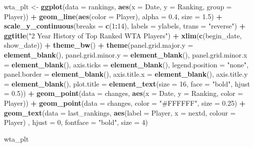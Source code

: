 \documentclass[]{book}
\newenvironment{Shaded}{\begin{snugshade}}{\end{snugshade}}
\newcommand{\DataTypeTok}[1]{\textcolor[rgb]{0.13,0.29,0.53}{#1}}
\newcommand{\DecValTok}[1]{\textcolor[rgb]{0.00,0.00,0.81}{#1}}
\newcommand{\FloatTok}[1]{\textcolor[rgb]{0.00,0.00,0.81}{#1}}
\newcommand{\KeywordTok}[1]{\textcolor[rgb]{0.13,0.29,0.53}{\textbf{#1}}}
\newcommand{\NormalTok}[1]{#1}
\newcommand{\OperatorTok}[1]{\textcolor[rgb]{0.81,0.36,0.00}{\textbf{#1}}}
\newcommand{\StringTok}[1]{\textcolor[rgb]{0.31,0.60,0.02}{#1}}
\begin{document}
\begin{Shaded}
\begin{Highlighting}[]
\NormalTok{wta_plt <-}\StringTok{ }\KeywordTok{ggplot}\NormalTok{(}\DataTypeTok{data =}\NormalTok{ rankings, }\KeywordTok{aes}\NormalTok{(}\DataTypeTok{x =}\NormalTok{ Date, }\DataTypeTok{y =}\NormalTok{ Ranking, }\DataTypeTok{group =}\NormalTok{ Player)) }\OperatorTok{+}\StringTok{ }
\StringTok{  }\KeywordTok{geom_line}\NormalTok{(}\KeywordTok{aes}\NormalTok{(}\DataTypeTok{color =}\NormalTok{ Player), }\DataTypeTok{alpha =} \FloatTok{0.4}\NormalTok{, }\DataTypeTok{size =} \FloatTok{1.5}\NormalTok{) }\OperatorTok{+}
\StringTok{  }\KeywordTok{scale_y_continuous}\NormalTok{(}\DataTypeTok{breaks =} \KeywordTok{c}\NormalTok{(}\DecValTok{1}\OperatorTok{:}\DecValTok{14}\NormalTok{), }\DataTypeTok{labels =}\NormalTok{ ylabels, }\DataTypeTok{trans =} \StringTok{"reverse"}\NormalTok{) }\OperatorTok{+}\StringTok{ }
\StringTok{  }\KeywordTok{ggtitle}\NormalTok{(}\StringTok{"2 Year History of Top Ranked WTA Players"}\NormalTok{) }\OperatorTok{+}\StringTok{ }
\StringTok{  }\KeywordTok{xlim}\NormalTok{(}\KeywordTok{c}\NormalTok{(begin_date, show_date)) }\OperatorTok{+}
\StringTok{  }\KeywordTok{theme_bw}\NormalTok{() }\OperatorTok{+}\StringTok{ }
\StringTok{  }\KeywordTok{theme}\NormalTok{(}\DataTypeTok{panel.grid.major.y =} \KeywordTok{element_blank}\NormalTok{(), }\DataTypeTok{panel.grid.minor.y =} \KeywordTok{element_blank}\NormalTok{(),}
        \DataTypeTok{panel.grid.minor.x =} \KeywordTok{element_blank}\NormalTok{(), }\DataTypeTok{axis.ticks =} \KeywordTok{element_blank}\NormalTok{(), }
        \DataTypeTok{legend.position =} \StringTok{"none"}\NormalTok{, }\DataTypeTok{panel.border =} \KeywordTok{element_blank}\NormalTok{(),}
        \DataTypeTok{axis.title.x =} \KeywordTok{element_blank}\NormalTok{(), }\DataTypeTok{axis.title.y =} \KeywordTok{element_blank}\NormalTok{(),}
        \DataTypeTok{plot.title =} \KeywordTok{element_text}\NormalTok{(}\DataTypeTok{size =} \DecValTok{16}\NormalTok{, }\DataTypeTok{face =} \StringTok{"bold"}\NormalTok{, }\DataTypeTok{hjust =} \FloatTok{0.5}\NormalTok{)) }\OperatorTok{+}\StringTok{ }\KeywordTok{geom_point}\NormalTok{(}\DataTypeTok{data =}\NormalTok{ changes, }\KeywordTok{aes}\NormalTok{(}\DataTypeTok{x =}\NormalTok{ Date, }\DataTypeTok{y =}\NormalTok{ Ranking, }\DataTypeTok{color =}\NormalTok{ Player)) }\OperatorTok{+}
\StringTok{  }\KeywordTok{geom_point}\NormalTok{(}\DataTypeTok{data =}\NormalTok{ changes, }\DataTypeTok{color =} \StringTok{"#FFFFFF"}\NormalTok{, }\DataTypeTok{size =} \FloatTok{0.25}\NormalTok{) }\OperatorTok{+}\StringTok{ }\KeywordTok{geom_text}\NormalTok{(}\DataTypeTok{data =}\NormalTok{ last_rankings,}
            \KeywordTok{aes}\NormalTok{(}\DataTypeTok{label =}\NormalTok{ Player, }\DataTypeTok{x =}\NormalTok{ nextd,  }\DataTypeTok{colour =}\NormalTok{ Player) , }\DataTypeTok{hjust =} \DecValTok{0}\NormalTok{,}
            \DataTypeTok{fontface =} \StringTok{"bold"}\NormalTok{, }\DataTypeTok{size =} \DecValTok{4}\NormalTok{)}

\NormalTok{wta_plt}
\end{Highlighting}
\end{Shaded}
\end{document}
